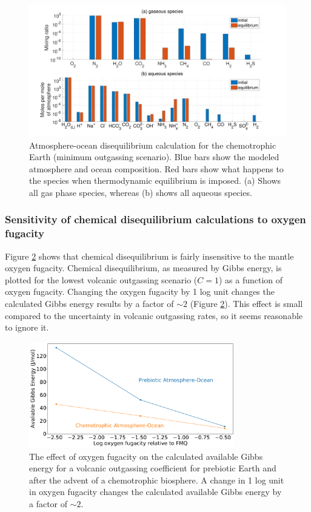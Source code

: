 \begin{figure}
  \centering
  \includegraphics[width=1.0\textwidth]{tex/2diseq/Figure8.pdf}
  \caption{Atmosphere-ocean disequilibrium calculation for the chemotrophic Earth (minimum outgassing scenario). Blue bars show the modeled atmosphere and ocean composition. Red bars show what happens to the species when thermodynamic equilibrium is imposed. (a) Shows all gas phase species, whereas (b) shows all aqueous species.}
  \label{fig:diseq_figure8}
\end{figure}

\subsubsection{Sensitivity of chemical disequilibrium calculations to oxygen fugacity} \label{sec:diseq_b3}

Figure \ref{fig:diseq_figure9} shows that chemical disequilibrium is fairly insensitive to the mantle oxygen fugacity. Chemical disequilibrium, as measured by Gibbs energy, is plotted for the lowest volcanic outgassing scenario ($C = 1$) as a function of oxygen fugacity. Changing the oxygen fugacity by 1 log unit changes the calculated Gibbs energy results by a factor of $\sim 2$ (Figure \ref{fig:diseq_figure9}). This effect is small compared to the uncertainty in volcanic outgassing rates, so it seems reasonable to ignore it.

\begin{figure}
  \centering
  \includegraphics[width=0.8\textwidth]{tex/2diseq/Figure9.pdf}
  \caption{The effect of oxygen fugacity on the calculated available Gibbs energy for a volcanic outgassing coefficient for prebiotic Earth and after the advent of a chemotrophic biosphere. A change in 1 log unit in oxygen fugacity changes the calculated available Gibbs energy by a factor of $\sim 2$. }
  \label{fig:diseq_figure9}
\end{figure}

